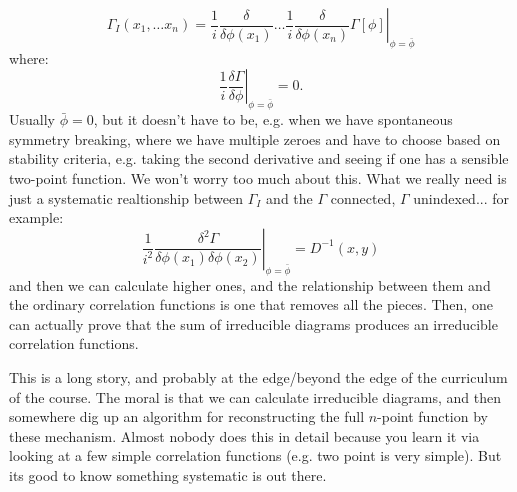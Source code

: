\begin{equation}
    \Gamma_I(x_1, \ldots x_n) = \left.\frac{1}{i}\frac{\delta}{\delta \phi(x_1)} \ldots \frac{1}{i}\frac{\delta}{\delta \phi(x_n)}\Gamma[\phi]\right|_{\phi = \bar{\phi}}
\end{equation}
where:
\begin{equation}
   \left. \frac{1}{i}\frac{\delta \Gamma}{\delta \phi}\right|_{\phi = \bar{\phi}} = 0.
\end{equation}
Usually $\bar{\phi} = 0$, but it doesn't have to be, e.g. when we have spontaneous symmetry breaking, where we have multiple zeroes and have to choose based on stability criteria, e.g. taking the second derivative and seeing if one has a sensible two-point function. We won't worry too much about this. What we really need is just a systematic realtionship between $\Gamma_I$ and the $\Gamma$ connected, $\Gamma$ unindexed... for example:
\begin{equation}
    \left.\frac{1}{i^2}\frac{\delta^2\Gamma}{\delta\phi(x_1)\delta\phi(x_2)}\right|_{\phi = \bar{\phi}} = D^{-1}(x, y)
\end{equation}
and then we can calculate higher ones, and the relationship between them and the ordinary correlation functions is one that removes all the pieces. Then, one can actually prove that the sum of irreducible diagrams produces an irreducible correlation functions.

This is a long story, and probably at the edge/beyond the edge of the curriculum of the course. The moral is that we can calculate irreducible diagrams, and then somewhere dig up an algorithm for reconstructing the full $n$-point function by these mechanism. Almost nobody does this in detail because you learn it via looking at a few simple correlation functions (e.g. two point is very simple). But its good to know something systematic is out there.